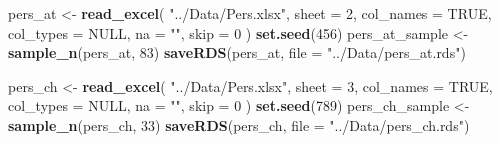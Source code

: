 \documentclass[]{article}
\newenvironment{Shaded}{\begin{snugshade}}{\end{snugshade}}
\newcommand{\KeywordTok}[1]{\textcolor[rgb]{0.13,0.29,0.53}{\textbf{{#1}}}}
\newcommand{\DataTypeTok}[1]{\textcolor[rgb]{0.13,0.29,0.53}{{#1}}}
\newcommand{\DecValTok}[1]{\textcolor[rgb]{0.00,0.00,0.81}{{#1}}}
\newcommand{\StringTok}[1]{\textcolor[rgb]{0.31,0.60,0.02}{{#1}}}
\newcommand{\OtherTok}[1]{\textcolor[rgb]{0.56,0.35,0.01}{{#1}}}
\newcommand{\NormalTok}[1]{{#1}}
\begin{document}
\begin{Shaded}
\begin{Highlighting}[]
\NormalTok{pers_at <-}\StringTok{ }\KeywordTok{read_excel}\NormalTok{(}
        \StringTok{"../Data/Pers.xlsx"}\NormalTok{,}
        \DataTypeTok{sheet =} \DecValTok{2}\NormalTok{,}
        \DataTypeTok{col_names =} \OtherTok{TRUE}\NormalTok{,}
        \DataTypeTok{col_types =} \OtherTok{NULL}\NormalTok{,}
        \DataTypeTok{na =} \StringTok{""}\NormalTok{,}
        \DataTypeTok{skip =} \DecValTok{0}
        \NormalTok{)}
\KeywordTok{set.seed}\NormalTok{(}\DecValTok{456}\NormalTok{)}
\NormalTok{pers_at_sample <-}\StringTok{ }\KeywordTok{sample_n}\NormalTok{(pers_at, }\DecValTok{83}\NormalTok{)}
\KeywordTok{saveRDS}\NormalTok{(pers_at, }\DataTypeTok{file =} \StringTok{"../Data/pers_at.rds"}\NormalTok{)}
\end{Highlighting}
\end{Shaded}

\begin{Shaded}
\begin{Highlighting}[]
\NormalTok{pers_ch <-}\StringTok{ }\KeywordTok{read_excel}\NormalTok{(}
        \StringTok{"../Data/Pers.xlsx"}\NormalTok{,}
        \DataTypeTok{sheet =} \DecValTok{3}\NormalTok{,}
        \DataTypeTok{col_names =} \OtherTok{TRUE}\NormalTok{,}
        \DataTypeTok{col_types =} \OtherTok{NULL}\NormalTok{,}
        \DataTypeTok{na =} \StringTok{""}\NormalTok{,}
        \DataTypeTok{skip =} \DecValTok{0}
        \NormalTok{)}
\KeywordTok{set.seed}\NormalTok{(}\DecValTok{789}\NormalTok{)}
\NormalTok{pers_ch_sample <-}\StringTok{ }\KeywordTok{sample_n}\NormalTok{(pers_ch, }\DecValTok{33}\NormalTok{)}
\KeywordTok{saveRDS}\NormalTok{(pers_ch, }\DataTypeTok{file =} \StringTok{"../Data/pers_ch.rds"}\NormalTok{)}
\end{Highlighting}
\end{Shaded}
\end{document}
